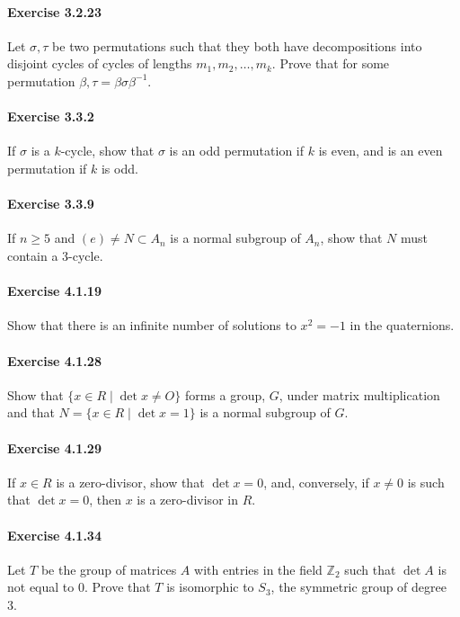 \documentclass{article}
\begin{document}
\paragraph{Exercise 3.2.23} Let $\sigma, \tau$ be two permutations such that they both have decompositions into disjoint cycles of cycles of lengths $m_1, m_2, \ldots, m_k$. Prove that for some permutation $\beta, \tau = \beta \sigma \beta^{-1}$.

\paragraph{Exercise 3.3.2} If $\sigma$ is a $k$-cycle, show that $\sigma$ is an odd permutation if $k$ is even, and is an even permutation if $k$ is odd.

\paragraph{Exercise 3.3.9} If $n \geq 5$ and $(e) \neq N \subset A_n$ is a normal subgroup of $A_n$, show that $N$ must contain a 3-cycle.

\paragraph{Exercise 4.1.19} Show that there is an infinite number of solutions to $x^2 = -1$ in the quaternions.

\paragraph{Exercise 4.1.28} Show that $\{x \in R \mid \det x \neq O\}$ forms a group, $G$, under matrix multiplication and that $N = \{x \in R \mid \det x = 1\}$ is a normal subgroup of $G$.

\paragraph{Exercise 4.1.29} If $x \in R$ is a zero-divisor, show that $\det x = 0$, and, conversely, if $x \neq 0$ is such that $\det x = 0$, then $x$ is a zero-divisor in $R$.

\paragraph{Exercise 4.1.34} Let $T$ be the group of matrices $A$ with entries in the field $\mathbb{Z}_2$ such that $\det A$ is not equal to 0. Prove that $T$ is isomorphic to $S_3$, the symmetric group of degree 3.
\end{document}
